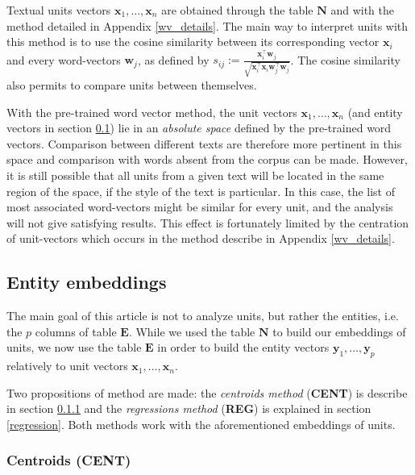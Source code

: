 \documentclass[
twocolumn,
]{ceurart}
\begin{document}
Textual units vectors $\mathbf{x}_1, \ldots, \mathbf{x}_n$ are obtained through the table $\mathbf{N}$ and with the method detailed in Appendix \ref{wv_details}. The main way to interpret units with this method is to use the cosine similarity between its corresponding vector $\mathbf{x}_i$ and every word-vectors $\mathbf{w}_j$, as defined by $s_{ij} := \frac{\mathbf{x}_i^\top \mathbf{w}_j}{\sqrt{\mathbf{x}_i^\top \mathbf{x}_i \mathbf{w}_j^\top \mathbf{w}_j}}$. The cosine similarity also permits to compare units between themselves.

With the pre-trained word vector method, the unit vectors $\mathbf{x}_1, \ldots, \mathbf{x}_n$ (and entity vectors in section \ref{entity_embeddings}) lie in an \emph{absolute space} defined by the pre-trained word vectors. Comparison between different texts are therefore more pertinent in this space and comparison with words absent from the corpus can be made. However, it is still possible that all units from a given text will be located in the same region of the space, if the style of the text is particular. In this case, the list of most associated word-vectors might be similar for every unit, and the analysis will not give satisfying results. This effect is fortunately limited by the centration of unit-vectors which occurs in the method describe in Appendix \ref{wv_details}.

\subsection{Entity embeddings}
\label{entity_embeddings}

The main goal of this article is not to analyze units, but rather the entities, i.e. the $p$ columns of table $\mathbf{E}$. While we used the table $\mathbf{N}$ to build our embeddings of units, we now use the table $\mathbf{E}$ in order to build the entity vectors $\mathbf{y}_1, \ldots, \mathbf{y}_p$ relatively to unit vectors $\mathbf{x}_1, \ldots, \mathbf{x}_n$. 

Two propositions of method are made: the \emph{centroids method} (\textbf{CENT}) is describe in section \ref{centroid} and the \emph{regressions method} (\textbf{REG}) is explained in section \ref{regression}. Both methods work with the aforementioned embeddings of units.

\subsubsection{Centroids (CENT)}
\label{centroid}
\end{document}
